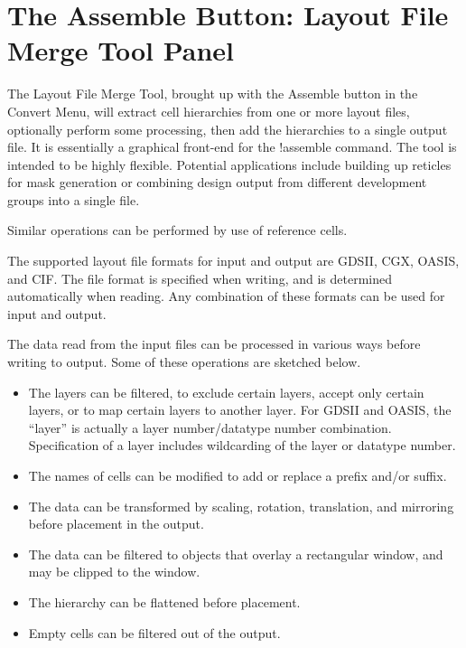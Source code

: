 \section{The {\cb Assemble} Button: {\cb Layout File Merge Tool} Panel}
The {\cb Layout File Merge Tool}, brought up with the {\cb Assemble}
button in the {\cb Convert Menu}, will extract cell hierarchies from
one or more layout files, optionally perform some processing, then add
the hierarchies to a single output file.  It is essentially a
graphical front-end for the {\cb !assemble} command.  The tool is
intended to be highly flexible.  Potential applications include
building up reticles for mask generation or combining design output
from different development groups into a single file.

Similar operations can be performed by use of reference cells.

The supported layout file formats for input and output are GDSII, CGX,
OASIS, and CIF.  The file format is specified when writing, and is
determined automatically when reading.  Any combination of these
formats can be used for input and output.

The data read from the input files can be processed in various ways
before writing to output.  Some of these operations are sketched
below.

\begin{itemize}
\item{The layers can be filtered, to exclude certain layers, accept
only certain layers, or to map certain layers to another layer.  For
GDSII and OASIS, the ``layer'' is actually a layer number/datatype
number combination.  Specification of a layer includes wildcarding of
the layer or datatype number.}

\item{The names of cells can be modified to add or replace a prefix
and/or suffix.}

\item{The data can be transformed by scaling, rotation, translation,
and mirroring before placement in the output.}

\item{The data can be filtered to objects that overlay a rectangular
window, and may be clipped to the window.}

\item{The hierarchy can be flattened before placement.}

\item{Empty cells can be filtered out of the output.}
\end{itemize}


